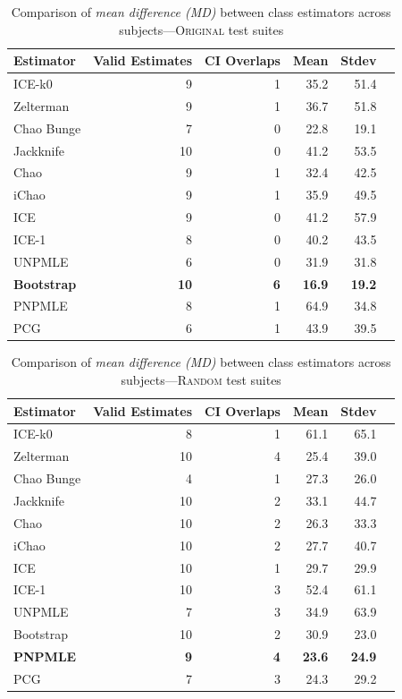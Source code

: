 \documentclass[sigconf,review,anonymous]{acmart}
\newcommand{\ICEallrare}{ICE-k0\xspace}
\newcommand{\Zelterman}{Zelterman\xspace}
\newcommand{\ChaoBunge}{Chao Bunge\xspace}
\newcommand{\Jackknife}{Jackknife\xspace}
\newcommand{\Chao}{Chao\xspace}
\newcommand{\improvedChao}{iChao\xspace}
\newcommand{\ICE}{ICE\xspace}
\newcommand{\improvedICE}{ICE-1\xspace}
\newcommand{\Unpmle}{UNPMLE\xspace}
\newcommand{\Bootstrap}{Bootstrap\xspace}
\newcommand{\Pnpmle}{PNPMLE\xspace}
\newcommand{\PCG}{PCG\xspace}
\newcommand{\original}{\textsc{Original}\xspace}
\newcommand{\EvosuiteRandom}{\textsc{Random}\xspace}
\newcommand{\B}[1]{\textbf{#1}}
\begin{document}
\begin{table}[t]
\caption{Comparison of \emph{mean difference (MD)} between class
estimators across subjects---\original test suites}
\begin{tabular}{|l|r|r|r|r|r|}
\hline
Estimator	&Valid Estimates	&CI Overlaps	&Mean	&Stdev	\\
\hline
\ICEallrare	&	9	&	1	&35.2	&	51.4\\
\Zelterman	&	9	&	1	&36.7	&	51.8\\
\ChaoBunge	&	7	&	0	&22.8	&	19.1\\
\Jackknife	&	10	&	0	&41.2	&	53.5\\
\Chao	&	9	&	1	&32.4	&	42.5\\
\improvedChao	&	9	&	1	&35.9	&	49.5\\
\ICE	&	9	&	0	&41.2	&	57.9\\
\improvedICE	&	8	&	0	&40.2	&	43.5\\
\Unpmle	&	6	&	0	&31.9	&	31.8\\
\B{\Bootstrap}	&	\B{10}	&	\B{6}	&\B{16.9}	&	\B{19.2}\\
\Pnpmle	&	8	&	1	&64.9	&	34.8\\
\PCG	&	6	&	1	&43.9	&	39.5\\
\hline
\end{tabular}
\label{tbl:estoriginalclass}
\end{table}
%
\begin{table}[t]
\caption{Comparison of \emph{mean difference (MD)} between class
estimators across subjects---\EvosuiteRandom test suites}
\begin{tabular}{|l|r|r|r|r|r|}
\hline
Estimator	&Valid Estimates	&CI Overlaps	&Mean	&Stdev	\\
\hline
\ICEallrare	&	8	&	1	&61.1	&	65.1\\
\Zelterman	&	10	&	4	&25.4	&	39.0\\
\ChaoBunge	&	4	&	1	&27.3	&	26.0\\
\Jackknife	&	10	&	2	&33.1	&	44.7\\
\Chao	&	10	&	2	&26.3	&	33.3\\
\improvedChao	&	10	&	2	&27.7	&	40.7\\
\ICE	&	10	&	1	&29.7	&	29.9\\
\improvedICE	&	10	&	3	&52.4	&	61.1\\
\Unpmle	&	7	&	3	&34.9	&	63.9\\
\Bootstrap	&	10	&	2	&30.9	&	23.0\\
\B{\Pnpmle}	&	\B{9}	&	\B{4}	&\B{23.6}	&	\B{24.9}\\
\PCG	&	7	&	3	&24.3	&	29.2\\
\hline
\end{tabular}
\label{tbl:estrandomclass}
\end{table}
\end{document}

